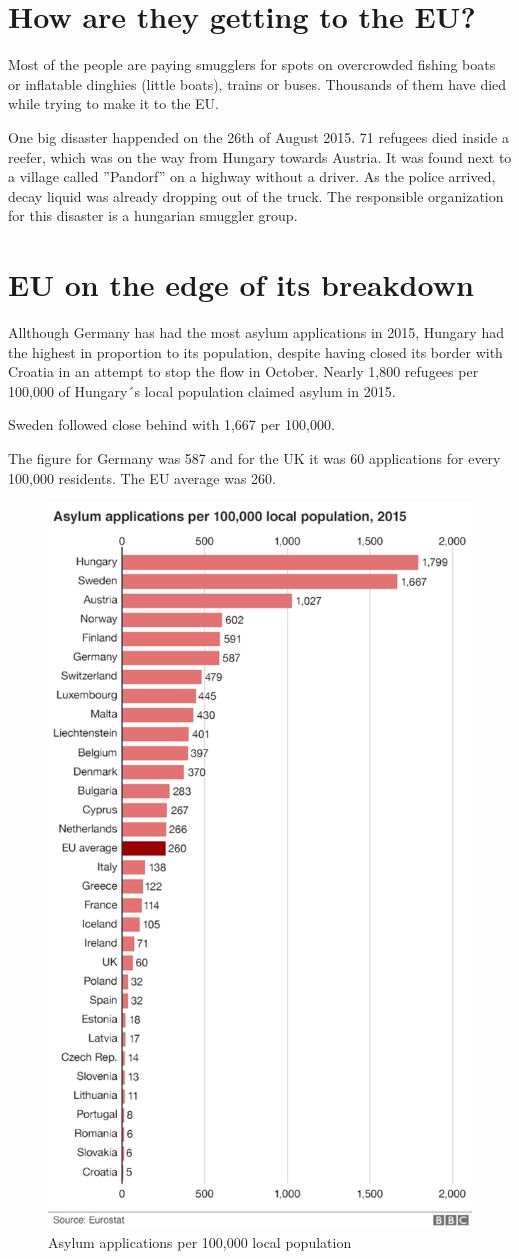 \section{How are they getting to the EU?}
Most of the people are paying smugglers for spots on overcrowded fishing boats or inflatable dinghies (little boats), trains or buses. Thousands of them have died while trying to make it to the EU.

One big disaster happended on the 26th of August 2015. 71 refugees died inside a reefer, which was on the way from Hungary towards Austria. It was found next to a village called ''Pandorf'' on a highway without a driver. As the police arrived, decay liquid was already dropping out of the truck. The responsible organization for this disaster is a hungarian smuggler group.

\section{EU on the edge of its breakdown}
Allthough Germany has had the most asylum applications in 2015, Hungary had the highest in proportion to its population, despite having closed its border with Croatia in an attempt to stop the flow in October. Nearly 1,800 refugees per 100,000 of Hungary´s local population claimed asylum in 2015.

Sweden followed close behind with 1,667 per 100,000.

The figure for Germany was 587 and for the UK it was 60 applications for every 100,000 residents. The EU average was 260.

\begin{figure}[!h]
	\begin{center}
		\includegraphics[width=0.5\linewidth]{images/asylums_per_100k}
		\caption{Asylum applications per 100,000 local population}
		\label{broker}
	\end{center}
\end{figure}

